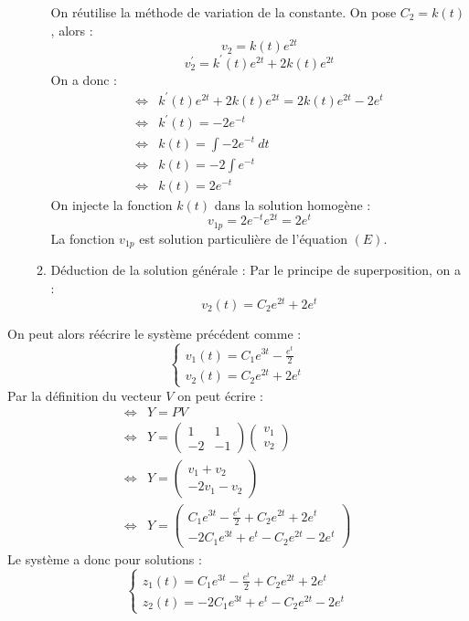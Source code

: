 \begin{ex}
\begin{enumerate}
\begin{enumerate}
        On réutilise la méthode de variation de la constante.
        On pose $C_2=k(t)$, alors :
        $$v_2=k(t)e^{2t}$$
        $$v_2^{\prime}=k^{\prime}(t)e^{2t}+2k(t)e^{2t}$$
        On a donc :
        \begin{align*}
            \Leftrightarrow & k^{\prime}(t)e^{2t}+2k(t)e^{2t}=2k(t)e^{2t}-2e^t\\
            \Leftrightarrow & k^{\prime}(t)=-2e^{-t}\\
            \Leftrightarrow & k(t) = \int -2e^{-t}\ dt\\
            \Leftrightarrow & k(t) = -2\int e^{-t}\\
            \Leftrightarrow & k(t) = 2e^{-t}
        \end{align*}
        On injecte la fonction $k(t)$ dans la solution homogène :
        $$v_{1p}=2e^{-t}e^{2t}=2e^{t}$$
        La fonction $v_{1p}$ est solution particulière de l'équation $(E)$.
        \item Déduction de la solution générale :
        Par le principe de superposition, on a :
        $$v_2(t)=C_2e^{2t}+2e^t$$
    \end{enumerate}
\end{enumerate}
On peut alors réécrire le système précédent comme :
$$\begin{cases}
v_1(t)=C_1e^{3t}-\frac{e^t}{2}\\
v_2(t)=C_2e^{2t}+2e^t
\end{cases}$$
Par la définition du vecteur $V$ on peut écrire :
\begin{align*}
    \Leftrightarrow & Y=PV\\
    \Leftrightarrow & Y=\begin{pmatrix}1&1\\-2&-1\end{pmatrix}\begin{pmatrix}v_1\\v_2\end{pmatrix}\\
    \Leftrightarrow & Y=\begin{pmatrix}v_1 +v_2\\-2v_1-v_2\end{pmatrix}\\
    \Leftrightarrow & Y=\begin{pmatrix}C_1e^{3t}-\frac{e^t}{2}+C_2e^{2t}+2e^t\\-2C_1e^{3t}+e^t-C_2e^{2t}-2e^t\end{pmatrix}
\end{align*}
Le système a donc pour solutions :
$$\begin{cases}
z_1(t)=C_1e^{3t}-\frac{e^t}{2}+C_2e^{2t}+2e^t\\
z_2(t)=-2C_1e^{3t}+e^t-C_2e^{2t}-2e^t
\end{cases}$$
\end{ex}
